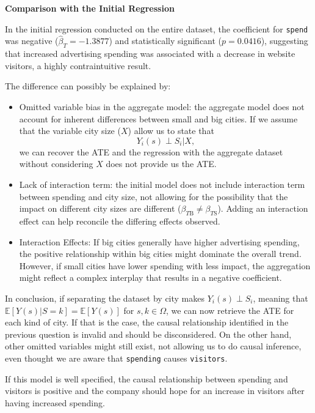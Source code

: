 \documentclass{article}
\begin{document}
\textbf{Comparison with the Initial Regression}

In the initial regression conducted on the entire dataset, the coefficient for \texttt{spend} was negative (\(\hat{\beta}_T = -1.3877\)) and statistically significant (\(p = 0.0416\)), suggesting that increased advertising spending was associated with a decrease in website visitors, a highly contraintuitive result.

The difference can possibly be explained by:

\begin{itemize}
  \item Omitted variable bias in the aggregate model: the aggregate model does not account for inherent differences between small and big cities. If we assume that the variable city size ($X$) allow us to state that
  $$
  Y_i(s) \perp S_i | X,
  $$
  we can recover the ATE and the regression with the aggregate dataset without considering $X$ does not provide us the ATE.
  \item Lack of interaction term: the initial model does not include interaction term between spending and city size, not allowing for the possibility that the impact on different city sizes are different ($\beta_{T \text{B}} \neq \beta_{T \text{S}}$). Adding an interaction effect can help reconcile the differing effects observed.
  \item Interaction Effects: If big cities generally have higher advertising spending, the positive relationship within big cities might dominate the overall trend. However, if small cities have lower spending with less impact, the aggregation might reflect a complex interplay that results in a negative coefficient.
\end{itemize}

In conclusion, if separating the dataset by city makes $Y_i(s) \perp S_i$, meaning that $\mathbb{E}[Y(s) | S = k] = \mathbb{E}[Y(s)]$ for $s, k \in \Omega$, we can now retrieve the ATE for each kind of city. If that is the case, the causal relationship identified in the previous question is invalid and should be disconsidered. On the other hand, other omitted variables might still exist, not allowing us to do causal inference, even thought we are aware that \texttt{spending} causes \texttt{visitors}.

If this model is well specified, the causal relationship between spending and visitors is positive and the company should hope for an increase in visitors after having increased spending.
\end{document}
